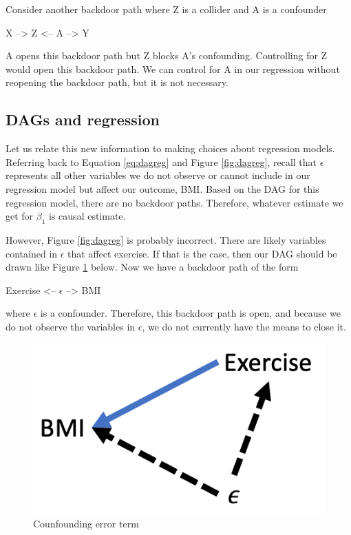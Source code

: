 \documentclass[
]{book}
\begin{document}
Consider another backdoor path where Z is a collider and A is a confounder

X --\textgreater{} Z \textless-- A --\textgreater{} Y

A opens this backdoor path but Z blocks A's confounding. Controlling for Z would open this backdoor path. We can control for A in our regression without reopening the backdoor path, but it is not necessary.

\hypertarget{dags-and-regression}{%
\subsection{DAGs and regression}\label{dags-and-regression}}

Let us relate this new information to making choices about regression models. Referring back to Equation \eqref{eq:dagreg} and Figure \ref{fig:dagreg}, recall that \(\epsilon\) represents all other variables we do not observe or cannot include in our regression model but affect our outcome, BMI. Based on the DAG for this regression model, there are no backdoor paths. Therefore, whatever estimate we get for \(\beta_1\) is causal estimate.

However, Figure \ref{fig:dagreg} is probably incorrect. There are likely variables contained in \(\epsilon\) that affect exercise. If that is the case, then our DAG should be drawn like Figure \ref{fig:dagregovb} below. Now we have a backdoor path of the form

Exercise \textless-- \(\epsilon\) --\textgreater{} BMI

where \(\epsilon\) is a confounder. Therefore, this backdoor path is open, and because we do not observe the variables in \(\epsilon\), we do not currently have the means to close it.

\begin{figure}
\includegraphics[width=6.65in]{images/dag_regovb} \caption{Counfounding error term}\label{fig:dagregovb}
\end{figure}
\end{document}
